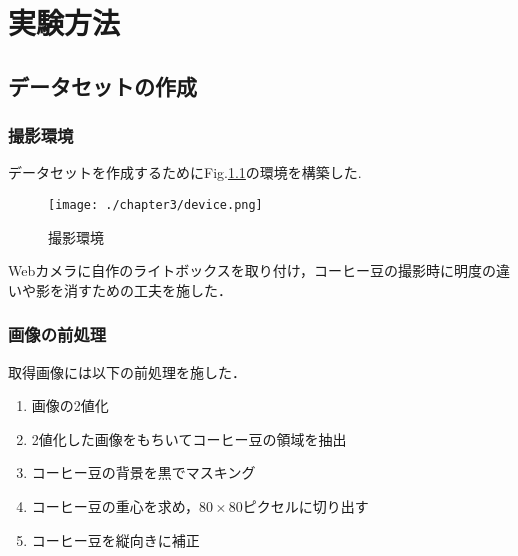
\chapter{実験方法}

\section{データセットの作成}
\subsection{撮影環境}
データセットを作成するためにFig.\ref{fig_camera}の環境を構築した.
\begin{figure}[]
  \begin{center}
    \texttt{[image: ./chapter3/device.png]}
    \caption{撮影環境}
    \label{fig_camera}
  \end{center}
\end{figure}
Webカメラに自作のライトボックスを取り付け，コーヒー豆の撮影時に明度の違いや影を消すための工夫を施した．

\subsection{画像の前処理}
取得画像には以下の前処理を施した．
\begin{enumerate}
\item 画像の2値化
\item 2値化した画像をもちいてコーヒー豆の領域を抽出
\item コーヒー豆の背景を黒でマスキング
\item コーヒー豆の重心を求め，$80\times 80$ピクセルに切り出す
\item コーヒー豆を縦向きに補正
\end{enumerate}
